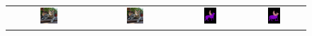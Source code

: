 \begin{figure}[ht]
\begin{tabular}{cccc}
    \includegraphics[width=0.22\textwidth]
    {figures/originals/2007_003778.jpg}
              &
    \includegraphics[width=0.22\textwidth]
    {figures/originals/2007_003778.jpg}
              &
    \includegraphics[width=0.22\textwidth]
    {figures/val_labels/weclip/2009_003768_[12, 14].png}
              &
    \includegraphics[width=0.22\textwidth]
    {figures/val_labels/ours/2009_003768_[12, 14].png} \\


\end{tabular}
\end{figure}
